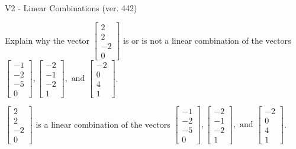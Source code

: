 \begin{exercise}
  \begin{exerciseTitle}V2 - Linear Combinations (ver. 442)\end{exerciseTitle}
  \begin{exerciseStatement}
    Explain why the vector \(\left[\begin{array}{c}
2 \\
2 \\
-2 \\
0
\end{array}\right]\)  is or is not a linear 
	combination of the vectors \(\left[\begin{array}{c}
-1 \\
-2 \\
-5 \\
0
\end{array}\right] , \left[\begin{array}{c}
-2 \\
-1 \\
-2 \\
1
\end{array}\right] , \text{ and } \left[\begin{array}{c}
-2 \\
0 \\
4 \\
1
\end{array}\right]\).
	


  \end{exerciseStatement}
  \begin{exerciseAnswer}
   \(\left[\begin{array}{c}
2 \\
2 \\
-2 \\
0
\end{array}\right]\) 
  	 is  
	a linear combination of the vectors \(\left[\begin{array}{c}
-1 \\
-2 \\
-5 \\
0
\end{array}\right] , \left[\begin{array}{c}
-2 \\
-1 \\
-2 \\
1
\end{array}\right] , \text{ and } \left[\begin{array}{c}
-2 \\
0 \\
4 \\
1
\end{array}\right]\).

	
  


  \end{exerciseAnswer}
\end{exercise}